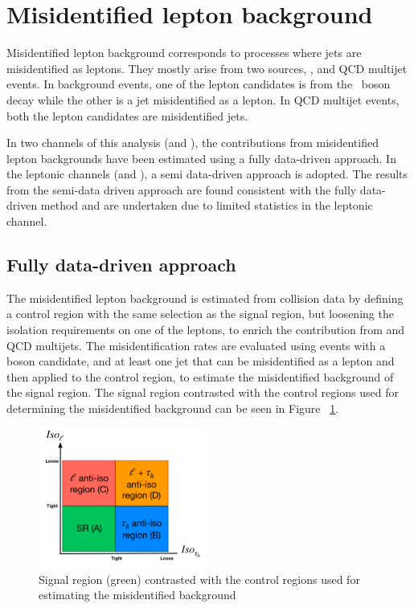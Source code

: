 \section{Misidentified lepton background}
Misidentified lepton background corresponds to processes where jets are misidentified as leptons. They mostly arise from two sources, \wjets, and QCD multijet events. In \wjets background events, one of the lepton candidates is from the \PW\, boson decay while the other is a jet misidentified as a lepton. In QCD multijet events, both the lepton candidates are misidentified jets.

In two channels of this analysis (\muhad and \ehad), the contributions from misidentified lepton backgrounds have been estimated using a fully data-driven approach. In the leptonic channels (\mue and \emu), a semi data-driven approach is adopted. The results from the semi-data driven approach are found consistent with the fully data-driven method and are undertaken due to limited statistics in the leptonic channel.

\subsection{Fully data-driven approach}
The misidentified lepton background is estimated from collision data by defining a control region with the same selection as the signal region, but loosening the isolation requirements on one of the leptons, to enrich the contribution from \wjets and QCD multijets. The misidentification rates are evaluated using events with a \PZ\, boson candidate, and at least one jet that can be misidentified as a lepton and then applied to the control region, to estimate the misidentified background of the signal region. The signal region contrasted with the control regions used for determining the misidentified background can be seen in Figure ~\ref{fig:fake}.

\begin{figure}[hbtp!]
  \centering
  \includegraphics[width=0.49\textwidth]{plots/chapter7/Fake/Fake.png}
  \caption{Signal region (green) contrasted with the control regions used for estimating the misidentified background}
  \label{fig:fake}
\end{figure}


